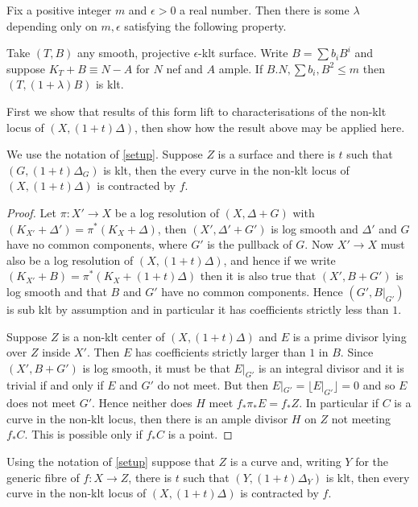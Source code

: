 \begin{theorem}\label{Jiang}\cite[Theorem 5.1]{jiang2018birational}
	Fix a positive integer $m$ and $\epsilon >0$ a real number. Then there is some $\lambda$ depending only on $m,\epsilon$ satisfying the following property.
	
	Take $(T,B)$ any smooth, projective $\epsilon$-klt surface. Write $B=\sum b_{i}B^{i}$ and suppose $K_{T}+B \equiv N-A$ for $N$ nef and $A$ ample. If $B.N,\sum b_{i}, B^{2} \leq m$ then $(T,(1+\lambda)B)$ is klt. 
\end{theorem}
First we show that results of this form lift to characterisations of the non-klt locus of $(X,(1+t)\Delta)$, then show how the result above may be applied here.
\begin{lemma}
	 We use the notation of \autoref{setup}. Suppose $Z$ is a surface and there is $t$ such that $(G,(1+t)\Delta_{G})$ is klt, then the every curve in the non-klt locus of $(X,(1+t)\Delta)$ is contracted by $f$.
\end{lemma}
\begin{proof}
	Let $\pi\colon X' \to X$ be a log resolution of $(X,\Delta+G)$ with $(K_{X'}+\Delta')=\pi^{*}(K_{X}+\Delta)$, then $(X',\Delta'+G')$ is log smooth and $\Delta'$ and $G$ have no common components, where $G'$ is the pullback of $G$. Now $X' \to X$ must also be a log resolution of $(X,(1+t)\Delta)$, and hence if we write $(K_{X'}+B)=\pi^{*}(K_{X}+(1+t)\Delta)$ then it is also true that $(X',B+G')$ is log smooth and that $B$ and $G'$ have no common components. Hence $(G',B|_{G'})$ is sub klt by assumption and in particular it has coefficients strictly less than $1$. 
	
	Suppose $Z$ is a non-klt center of $(X,(1+t)\Delta)$ and $E$ is a prime divisor lying over $Z$ inside $X'$. Then $E$ has coefficients strictly larger than $1$ in $B$. Since $(X',B+G')$ is log smooth, it must be that $E|_{G'}$ is an integral divisor and it is trivial if and only if $E$ and $G'$ do not meet. But then $E|_{G'} =\lfloor E|_{G'} \rfloor =0$ and so $E$ does not meet $G'$. Hence neither does $H$ meet $f_{*}\pi_{*}E=f_{*}Z$. In particular if $C$ is a curve in the non-klt locus, then there is an ample divisor $H$ on $Z$ not meeting $f_{*}C$. This is possible only if $f_{*}C$ is a point. 
\end{proof}


\begin{lemma}
	Using the notation of \autoref{setup} suppose that $Z$ is a curve and, writing $Y$ for the generic fibre of $f\colon X\to Z$, there is $t$ such that $(Y,(1+t)\Delta_{Y})$ is klt, then every curve in the non-klt locus of $(X,(1+t)\Delta)$ is contracted by $f$.
\end{lemma}

